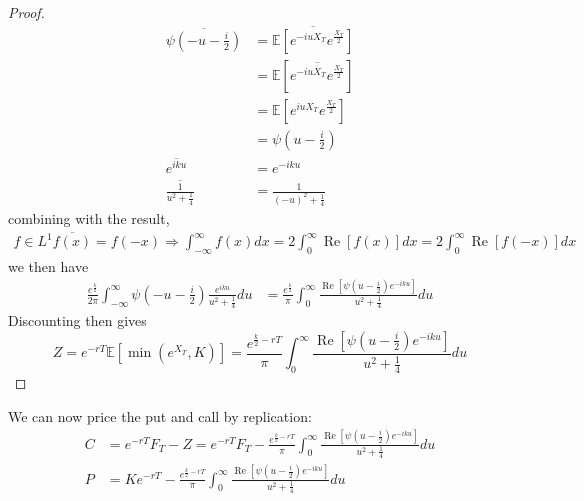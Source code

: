 \begin{proof}
\begin{align}
    \overline{\psi(-u-\frac{i}{2})}&=\overline{\mathbb{E}[e^{-iuX_T}e^{\frac{X_T}{2}}]}\\
    &=\mathbb{E}[\overline{e^{-iuX_T}e^{\frac{X_T}{2}}}]\\
    &=\mathbb{E}[e^{iuX_T}e^{\frac{X_T}{2}}]\\
    &=\psi(u-\frac{i}{2})\\
    \overline{e^{iku}}&=e^{-iku}\\
    \overline{\frac{1}{u^2+\frac{1}{4}}}&=\frac{1}{(-u)^2+\frac{1}{4}}
\end{align}
combining with the result,
\begin{align}
f\in L^1 \overline{f(x)}=f(-x)\Rightarrow \int_{-\infty}^{\infty}f(x)dx = 2\int_{0}^{\infty}\operatorname{Re}[f(x)]dx=2\int_{0}^{\infty}\operatorname{Re}[f(-x)]dx
\end{align}
we then have
\begin{align}
    \frac{e^{\frac{k}{2}}}{2\pi}\int_{-\infty}^{\infty}\psi(-u-\frac{i}{2})\frac{e^{i k u}}{u^2+\frac{1}{4}}du
    &=\frac{e^{\frac{k}{2}}}{\pi}\int_{0}^{\infty}\frac{\operatorname{Re}[\psi(u-\frac{i}{2})e^{-i k u}]}{u^2+\frac{1}{4}}du
\end{align}
Discounting then gives
\begin{equation}
Z = e^{-rT}\mathbb{E}[\min(e^{X_T},K)] = \frac{e^{\frac{k}{2}-rT}}{\pi}\int_{0}^{\infty}\frac{\operatorname{Re}[\psi(u-\frac{i}{2})e^{-i k u}]}{u^2+\frac{1}{4}}du
\end{equation}
\end{proof}
\begin{remark}
We can now price the put and call by replication:
\begin{align}
C &= e^{-rT}F_T-Z = e^{-rT}F_T-\frac{e^{\frac{k}{2}-rT}}{\pi}\int_{0}^{\infty}\frac{\operatorname{Re}[\psi(u-\frac{i}{2})e^{-i k u}]}{u^2+\frac{1}{4}}du\\
P &= Ke^{-rT}-\frac{e^{\frac{k}{2}-rT}}{\pi}\int_{0}^{\infty}\frac{\operatorname{Re}[\psi(u-\frac{i}{2})e^{-i k u}]}{u^2+\frac{1}{4}}du
\end{align}
\end{remark}
